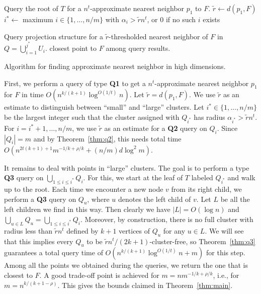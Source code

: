 \documentclass[a4paper,11pt]{paper}
\newenvironment{alg}{\begin{algorithm}[htbp]}{\end{algorithm}}
\begin{document}
\begin{alg}
  \DontPrintSemicolon
{}
  Query the root of $T$ for a
  $n^t$-approximate nearest neighbor $p_1$ to $F$.
  $\widetilde{r} \gets d(p_1, F)$\;
  $i^*\gets$ maximum
  $i\in \{1, \dots, n/m\}$ with $\alpha_{i}> \widetilde{r} n^t$,
  or $0$
  if no such $i$ exists\;

  Query projection structure for a
  $\widetilde{r}$-thresholded nearest neighbor of $F$ in
  $Q = \bigcup_{i = 1}^{j^*} U_i$.
  \Return closest point to $F$ among query results.
 \caption{Algorithm for finding approximate nearest neighbor in
   high dimensions.}
 \label{alg:high-dim-query}
\end{alg}

First, we perform a query of type \textbf{Q1}
to get a $n^t$-approximate nearest neighbor $p_1$ for $F$ in time
$O(n^{k/(k+1)}\log^{O(1/t)}n)$. Let $\widetilde{r} = d(p_1, F)$.
We use $\widetilde{r}$ as an estimate to distinguish between
``small'' and
``large'' clusters. Let $i^* \in \{1,\dots,n/m\}$
be the largest integer such that the cluster assigned with $Q_{i^*}$
has radius $\alpha_{i^*} > \widetilde{r} n^t$.
For $i = i^* + 1, \dots,  n/m$,
we use $\widetilde{r}$ as an estimate for a \textbf{Q2} query
on $Q_i$. Since
$|Q_i| = m$ and by Theorem~\ref{thm:q2},
this needs
total time
$O(n^{2t(k + 1) + 1}m^{-1/k + \rho/k} + (n/m)d\log^2 m)$.

It remains to deal with points in ``large'' clusters.
The goal is to perform a type \textbf{Q3}
query on $\bigcup_{1 \leq i \leq i^*} Q_i$. For this, we start at the
leaf of $T$ labeled $Q_{i^*}$ and walk up to the root.
Each time we encounter a new node $v$ from its right child,
we perform a \textbf{Q3} query on $Q_u$, where $u$ denotes the
left child of $v$.
Let $L$ be all the left children we find in this way. Then clearly
we have $|L| = O(\log n)$  and
$\bigcup_{u \in L} Q_u = \bigcup_{1 \leq i \leq i^*} Q_i$.
Moreover, by construction, there is no full cluster with radius
less than
$\widetilde{r} n^t$ defined by $k+1$ vertices of $Q_u$
for any $u \in L$.
We will see that this implies every $Q_u$ to be
$\widetilde{r} n^t/(2k+1)$-cluster-free, so
Theorem~\ref{thm:q3} guarantees a total query
time of $O(n^{k/(k+1)}\log^{O(1/t)} n + m)$ for this step.
Among all the points we obtained during the queries,
we return the one that is closest to $F$.
A good trade-off point is achieved for $m = nm^{-1/k+\rho/k}$,
i.e., for $m = n^{k/(k+1-\rho)}$.
This gives the bounds claimed in Theorem~\ref{thm:main}.
\end{document}
